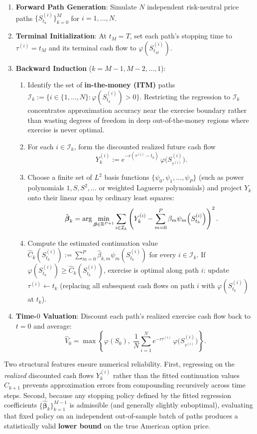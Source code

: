 \begin{enumerate}
    \item \textbf{Forward Path Generation}: Simulate $N$ independent risk-neutral price paths $\{S_{t_k}^{(i)}\}_{k=0}^M$ for $i = 1, \ldots, N$.
    \item \textbf{Terminal Initialization}: At $t_M = T$, set each path's stopping time to $\tau^{(i)} = t_M$ and its terminal cash flow to $\varphi(S_{t_M}^{(i)})$.
    \item \textbf{Backward Induction} ($k = M - 1, M - 2, \ldots, 1$):
    \begin{enumerate}
        \item Identify the set of \textbf{in-the-money (ITM)} paths $\mathcal{I}_k := \bigl\{i \in \{1, \ldots, N\} : \varphi(S_{t_k}^{(i)}) > 0\bigr\}$. Restricting the regression to $\mathcal{I}_k$ concentrates approximation accuracy near the exercise boundary rather than wasting degrees of freedom in deep out-of-the-money regions where exercise is never optimal.
        \item For each $i \in \mathcal{I}_k$, form the discounted realized future cash flow
        \[
        Y_k^{(i)} := e^{-r(\tau^{(i)} - t_k)}\,\varphi\bigl(S_{\tau^{(i)}}^{(i)}\bigr).
        \]
        \item Choose a finite set of $L^2$ basis functions $\{\psi_0, \psi_1, \ldots, \psi_P\}$ (such as power polynomials $1, S, S^2, \ldots$ or weighted Laguerre polynomials) and project $Y_k$ onto their linear span by ordinary least squares:
        \[
        \hat{\boldsymbol{\beta}}_k = \arg\min_{\boldsymbol{\beta} \in \mathbb{R}^{P+1}} \sum_{i \in \mathcal{I}_k} \left(Y_k^{(i)} - \sum_{m=0}^P \beta_m \psi_m\!\left(S_{t_k}^{(i)}\right)\right)^2.
        \]
        \item Compute the estimated continuation value $\widehat{C}_k(S_{t_k}^{(i)}) := \sum_{m=0}^P \hat{\beta}_{k,m}\psi_m(S_{t_k}^{(i)})$ for every $i \in \mathcal{I}_k$. If $\varphi(S_{t_k}^{(i)}) \ge \widehat{C}_k(S_{t_k}^{(i)})$, exercise is optimal along path $i$: update $\tau^{(i)} \leftarrow t_k$ (replacing all subsequent cash flows on path $i$ with $\varphi(S_{t_k}^{(i)})$ at $t_k$).
    \end{enumerate}
    \item \textbf{Time-$0$ Valuation}: Discount each path's realized exercise cash flow back to $t = 0$ and average:
    \[
    \hat{V}_0 = \max\!\left\{\varphi(S_0),\; \frac{1}{N}\sum_{i=1}^N e^{-r\tau^{(i)}}\,\varphi\bigl(S_{\tau^{(i)}}^{(i)}\bigr)\right\}.
    \]
\end{enumerate}
Two structural features ensure numerical reliability. First, regressing on the \emph{realized} discounted cash flows $Y_k^{(i)}$ rather than the fitted continuation values $\widehat{C}_{k+1}$ prevents approximation errors from compounding recursively across time steps. Second, because any stopping policy defined by the fitted regression coefficients $\{\hat{\boldsymbol{\beta}}_k\}_{k=1}^{M-1}$ is admissible (and generally slightly suboptimal), evaluating that fixed policy on an independent out-of-sample batch of paths produces a statistically valid \textbf{lower bound} on the true American option price.

